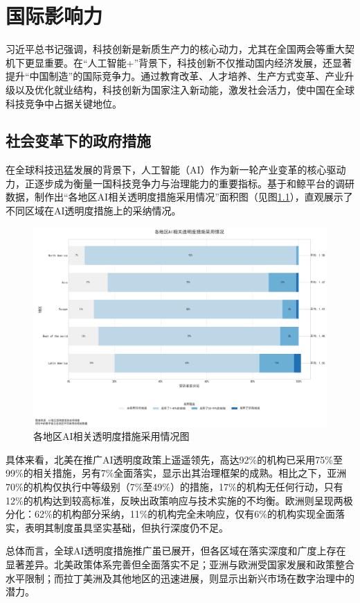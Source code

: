 \chapter{国际影响力}
\label{chapter:impact}
习近平总书记强调，科技创新是新质生产力的核心动力，尤其在全国两会等重大契机下更显重要。在“人工智能+”背景下，科技创新不仅推动国内经济发展，还显著提升“中国制造”的国际竞争力。通过教育改革、人才培养、生产方式变革、产业升级以及优化就业结构，科技创新为国家注入新动能，激发社会活力，使中国在全球科技竞争中占据关键地位。

\section{社会变革下的政府措施}
在全球科技迅猛发展的背景下，人工智能（AI）作为新一轮产业变革的核心驱动力，正逐步成为衡量一国科技竞争力与治理能力的重要指标。基于和鲸平台的调研数据，制作出“各地区AI相关透明度措施采用情况”面积图（见图\ref{各地区AI相关透明度措施采用情况图}），直观展示了不同区域在AI透明度措施上的采纳情况。
\begin{figure}[H]
    \centering
    \includegraphics[width=0.7\linewidth]{figure/21各地区AI相关透明度措施采用情况图.png}
    \caption{各地区AI相关透明度措施采用情况图}
    \label{各地区AI相关透明度措施采用情况图}
\end{figure}

具体来看，北美在推广AI透明度政策上遥遥领先，高达92\%的机构已采用75\%至99\%的相关措施，另有7\%全面落实，显示出其治理框架的成熟。相比之下，亚洲70\%的机构仅执行中等级别（7\%至49\%）的措施，17\%的机构无任何行动，只有12\%的机构达到较高标准，反映出政策响应与技术实施的不均衡。欧洲则呈现两极分化：62\%的机构部分采纳，11\%的机构完全未响应，仅有6\%的机构实现全面落实，表明其制度虽具坚实基础，但执行深度仍不足。

总体而言，全球AI透明度措施推广虽已展开，但各区域在落实深度和广度上存在显著差异。北美政策体系完善但全面落实不足；亚洲与欧洲受国家发展和政策整合水平限制；而拉丁美洲及其他地区的迅速进展，则显示出新兴市场在数字治理中的潜力。

